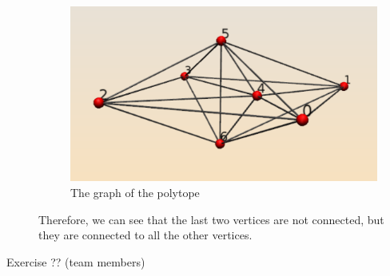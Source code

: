 \begin{description}
\begin{figure}[!h]
\centering \includegraphics[width=\textwidth]{alex-alvarez-exercise-graph}
\caption{The graph of the polytope}
\end{figure}
Therefore, we can see that the last two vertices are not connected, but they are connected to all the other vertices.
\item[Exercise ?? (team members)] 
\end{description}



